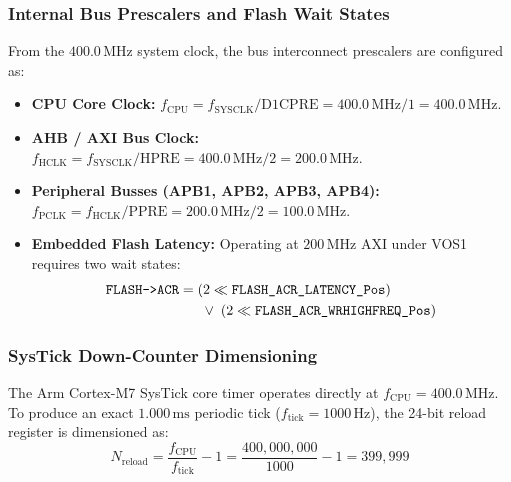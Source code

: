 \subsubsection{Internal Bus Prescalers and Flash Wait States}
From the $400.0\,\text{MHz}$ system clock, the bus interconnect prescalers are configured as:
\begin{itemize}
  \item \textbf{CPU Core Clock:} $f_{\text{CPU}} = f_{\text{SYSCLK}} / \text{D1CPRE} = 400.0\,\text{MHz} / 1 = 400.0\,\text{MHz}$.
  \item \textbf{AHB / AXI Bus Clock:} $f_{\text{HCLK}} = f_{\text{SYSCLK}} / \text{HPRE} = 400.0\,\text{MHz} / 2 = 200.0\,\text{MHz}$.
  \item \textbf{Peripheral Busses (APB1, APB2, APB3, APB4):} $f_{\text{PCLK}} = f_{\text{HCLK}} / \text{PPRE} = 200.0\,\text{MHz} / 2 = 100.0\,\text{MHz}$.
  \item \textbf{Embedded Flash Latency:} Operating at $200\,\text{MHz}$ AXI under VOS1 requires two wait states:
        \begin{equation}
        \begin{split}
          \code{FLASH->ACR} = {} & (2 \ll \code{FLASH_ACR_LATENCY_Pos}) \\
                                 & \;\lor\; (2 \ll \code{FLASH_ACR_WRHIGHFREQ_Pos})
        \end{split}
        \end{equation}
\end{itemize}

\subsubsection{SysTick Down-Counter Dimensioning}
The Arm Cortex-M7 SysTick core timer operates directly at $f_{\text{CPU}} = 400.0\,\text{MHz}$.
To produce an exact $1.000\,\text{ms}$ periodic tick ($f_{\text{tick}} = 1000\,\text{Hz}$), the 24-bit reload
register is dimensioned as:
\begin{equation}
  N_{\text{reload}} = \frac{f_{\text{CPU}}}{f_{\text{tick}}} - 1 = \frac{400{,}000{,}000}{1000} - 1 = 399{,}999
  \label{eq:systick}
\end{equation}

